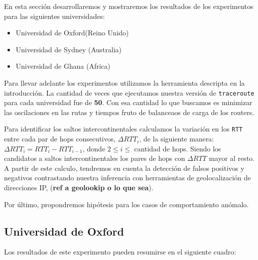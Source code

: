 En esta sección desarrollaremos y mostraremos los resultados de los experimentos para las siguientes
universidades:

\begin{itemize}
\item Universidad de Oxford(Reino Unido)
\item Universidad de Sydney (Australia)
\item Universidad de Ghana (Africa)
\end{itemize}

Para llevar adelante los experimentos utilizamos la herramienta descripta en la introducción. La cantidad de veces que ejecutamos nuestra versión de \texttt{traceroute} para cada universidad fue de \textbf{50}. Con esa cantidad lo que buscamos  es minimizar las oscilaciones en las rutas y tiempos fruto de balanceaos de carga de los routers.

Para identificar los saltos intercontinentales calculamos la variación en los \texttt{RTT} entre cada par de hops consecutivos, $\Delta RTT_{i}$, de la siguiente manera: \(\Delta RTT_{i} = RTT_{i} - RTT_{i-1}\), donde $2 \leq i \leq$ cantidad de hops. Siendo los candidatos a saltos intercontinentales los pares de hops con $\Delta RTT$ mayor al resto. A partir de este calculo, tendremos en cuenta la detección de falsos positivos y negativos contrastando nuestra inferencia con herramientas de geolocalización de direcciones IP, (\textbf{ref a geolookip o lo que sea}).

Por último, propondremos hipótesis para los casos de comportamiento anómalo.

\subsection{Universidad de Oxford}

Los resultados de este experimento pueden resumirse en el siguiente cuadro:

